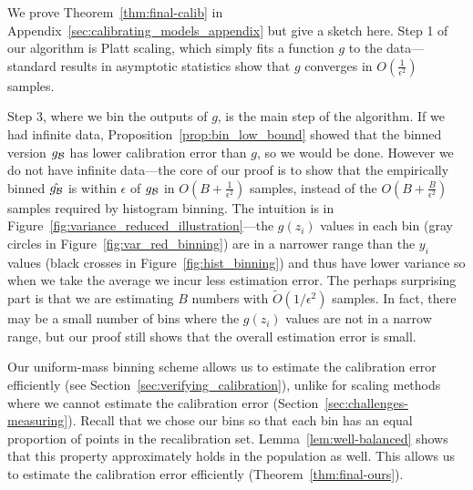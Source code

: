 We prove Theorem~\ref{thm:final-calib} in Appendix~\ref{sec:calibrating_models_appendix} but give a sketch here. Step 1 of our algorithm is Platt scaling, which simply fits a function $g$ to the data---standard results in asymptotic statistics show that $g$ converges in $O(\frac{1}{\epsilon^2})$ samples.

Step 3, where we bin the outputs of $g$, is the main step of the algorithm. If we had infinite data, Proposition~\ref{prop:bin_low_bound} showed that the binned version $g_{\mathcal{B}{}}$ has lower calibration error than $g$, so we would be done. However we do not have infinite data---the core of our proof is to show that the empirically binned $\hat{g_{\mathcal{B}{}}}$ is within $\epsilon$ of $g_{\mathcal{B}{}}$ in $O(B + \frac{1}{\epsilon^2})$ samples, instead of the $O(B + \frac{B}{\epsilon^2})$ samples required by histogram binning. The intuition is in Figure~\ref{fig:variance_reduced_illustration}---the $g(z_i)$ values in each bin (gray circles in Figure~\ref{fig:var_red_binning}) are in a narrower range than the $y_i$ values (black crosses in Figure~\ref{fig:hist_binning}) and thus have lower variance so when we take the average we incur less estimation error. The perhaps surprising part is that we are estimating $B$ numbers with $\widetilde{O}(1/\epsilon^2)$ samples. In fact, there may be a small number of bins where the $g(z_i)$ values are not in a narrow range, but our proof still shows that the overall estimation error is small.

Our uniform-mass binning scheme allows us to estimate the calibration error efficiently (see Section~\ref{sec:verifying_calibration}), unlike for scaling methods where we cannot estimate the calibration error (Section~\ref{sec:challenges-measuring}).
Recall that we chose our bins so that each bin has an equal proportion of points in the recalibration set.
Lemma~\ref{lem:well-balanced} shows that this property approximately holds in the population as well.
This allows us to estimate the calibration error efficiently (Theorem~\ref{thm:final-ours}).

